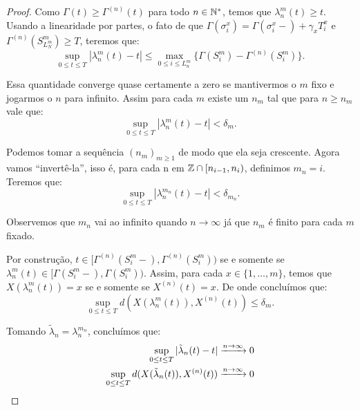 \begin{proof}
  Como $\Gamma(t) \geq \Gamma^{(n)}(t)$ para todo $n \in {\mathbb{N^*}}$, temos
  que $\lambda_n^m(t) \geq t$. Usando a linearidade por partes, o fato
  de que $\Gamma(\sigma^x_i) = \Gamma(\sigma_i^x-) + \gamma_x T^x_i$ e
  $\Gamma^{(n)}(S^m_{L_N^m}) \geq T$, teremos que:
  \begin{displaymath}
    \sup_{0 \leq t \leq T} |\lambda_n^m(t) - t| \leq
    \max_{0 \leq i \leq L_n^m} \{ \Gamma(S_i^m) -
    \Gamma^{(n)}(S_i^m)\}.
  \end{displaymath}

  Essa quantidade converge quase certamente a zero se mantivermos o
  $m$ fixo e jogarmos o $n$ para infinito. Assim para cada $m$ existe
  um $n_m$ tal que para $n \geq n_m$ vale que:
  \begin{displaymath}
    \sup_{0 \leq t \leq T} |\lambda_n^m(t) - t| < \delta_m.
  \end{displaymath}

  Podemos tomar a sequência $(n_m)_{m \geq 1}$ de modo que ela seja
  crescente. Agora vamos ``invertê-la'', isso é, para cada n em ${\mathbb{Z}}
  \cap [n_{i-1}, n_i)$, definimos $m_n = i$. Teremos que:
  \begin{displaymath}
    \sup_{0 \leq t \leq T} |\lambda_n^{m_n}(t) - t| < \delta_{m_n}.
  \end{displaymath}

  Observemos que $m_n$ vai ao infinito quando $n \to \infty$ já que
  $n_m$ é finito para cada $m$ fixado.
  
  Por construção, $t \in [\Gamma^{(n)}(S_{i}^m-),
  \Gamma^{(n)}(S_{i}^m))$ se e somente se $\lambda_n^m(t) \in
  [\Gamma(S_{i}^m-), \Gamma(S_{i}^m))$. Assim, para cada $x \in \{1,
  \ldots, m\}$, temos que $X(\lambda_n^m(t)) = x$ se e somente se
  $X^{(n)}(t) = x$. De onde concluímos que:
  \begin{displaymath}
    \sup_{0 \leq t \leq T} d\left(X(\lambda_n^m(t)), X^{(n)} (t)\right)
    \leq \delta_m.
  \end{displaymath}

  Tomando $\tilde{\lambda}_n = \lambda_n^{m_n}$, concluímos que:
  \begin{align*}
    \sup_{0 \leq t \leq T} |\tilde{\lambda}_n(t) - t|
    &\xrightarrow{n\to\infty} 0 \\
    \sup_{0 \leq t \leq T} d(X(\tilde{\lambda}_n(t)), X^{(n)}(t))
    &\xrightarrow{n\to\infty} 0
    \qedhere
  \end{align*}
\end{proof}

